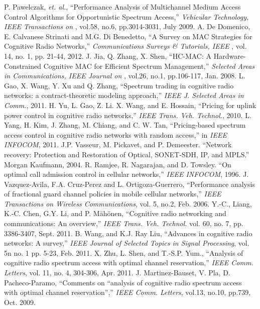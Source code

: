 \begin{thebibliography}{}
 P. Pawelczak, \textit{et. al.}, ``Performance Analysis of Multichannel Medium Access Control Algorithms for Opportunistic Spectrum Access,'' \emph{Vehicular Technology, IEEE Transactions on }, vol.58, no.6, pp.3014-3031, July 2009.
 A. De Domenico, E. Calvanese Strinati and M.G. Di Benedetto, ``A Survey on MAC Strategies for Cognitive Radio Networks,'' \emph{Communications Surveys \& Tutorials, IEEE }, vol. 14, no. 1, pp. 21-44, 2012.
 J. Jia, Q. Zhang, X. Shen, ``HC-MAC: A Hardware-Constrained Cognitive MAC for Efficient Spectrum Management,'' \emph{Selected Areas in Communications, IEEE Journal on }, vol.26, no.1, pp.106-117, Jan. 2008.
 L. Gao, X. Wang, Y. Xu and Q. Zhang, ``Spectrum trading in cognitive radio networks: a contract-theoretic modeling approach,'' \emph{IEEE J. Selected Areas in Comm.}, 2011.
 H. Yu, L. Gao, Z. Li. X. Wang, and E. Hossain, ``Pricing for uplink power control in cognitive radio networks,''\emph{ IEEE Trans. Veh. Technol.}, 2010.
 L. Yang, H. Kim, J. Zhang, M. Chiang, and C. W. Tan, ``Pricing-based spectrum access control in cognitive radio networks with random access,'' in \textit{IEEE INFOCOM}, 2011.
 J.P. Vasseur, M. Pickavet, and P. Demeester. ``Network recovery: Protection and Restoration of Optical, SONET-SDH, IP, and MPLS.'' Morgan Kaufmann, 2004.
 R. Ramjee, R. Nagarajan, and D. Towsley. ``On optimal call admission
control in cellular networks,'' \emph{IEEE INFOCOM}, 1996.
 J. Vazquez-Avila, F.A. Cruz-Perez and L. Ortigoza-Guerrero, ``Performance analysis of fractional guard channel policies in mobile
cellular networks,'' \emph{IEEE Transactions on Wireless Communications}, vol. 5, no.2, Feb. 2006.
 Y.-C., Liang, K.-C. Chen, G.Y. Li, and P. Mähönen, ``Cognitive radio networking and communications: An overview,''\emph{ IEEE Trans. Veh. Technol.} vol. 60, no. 7, pp. 3386-3407, Sept. 2011.
 B. Wang, and K.J. Ray Liu, ``Advances in cognitive radio networks: A survey,'' \emph{IEEE Journal of Selected Topics in Signal Processing}, vol. 5n no. 1 pp. 5-23, Feb. 2011.
 X. Zhu, L. Shen, and T.-S.P. Yum., ``Analysis of cognitive radio spectrum access with optimal channel reservation,'' \emph{IEEE  Comm. Letters}, vol. 11, no. 4, 304-306, Apr. 2011.
 J. Martinez-Bauset, V. Pla, D. Pacheco-Paramo, ``Comments on ``analysis of cognitive radio spectrum access with optimal channel reservation'','' \emph{IEEE  Comm. Letters}, vol.13, no.10, pp.739, Oct. 2009.

\end{thebibliography}
